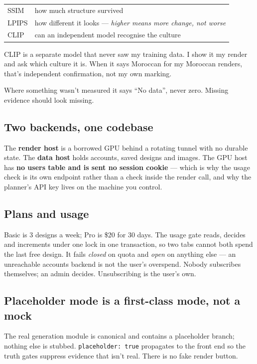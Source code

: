 \documentclass[10.5pt,a4paper]{article}
\begin{document}
\begin{tabularx}{\linewidth}{@{}lX@{}}
\toprule
SSIM & how much structure survived\\
LPIPS & how different it looks --- \emph{higher means more change, not worse}\\
CLIP & can an independent model recognise the culture\\
\bottomrule
\end{tabularx}

\begin{sayit}
CLIP is a separate model that never saw my training data. I show it my render and ask which culture
it is. When it says Moroccan for my Moroccan renders, that's independent confirmation, not my own
marking.
\end{sayit}
\begin{sayit}
Where something wasn't measured it says ``No data'', never zero. Missing evidence should look missing.
\end{sayit}

\subsection*{Two backends, one codebase}
The \textbf{render host} is a borrowed GPU behind a rotating tunnel with no durable state. The
\textbf{data host} holds accounts, saved designs and images. The GPU host has \textbf{no users table
and is sent no session cookie} --- which is why the usage check is its own endpoint rather than a
check inside the render call, and why the planner's API key lives on the machine you control.

\subsection*{Plans and usage}
Basic is 3 designs a week; Pro is \$20 for 30 days. The usage gate reads, decides and increments
under one lock in one transaction, so two tabs cannot both spend the last free design. It fails
\emph{closed} on quota and \emph{open} on anything else --- an unreachable accounts backend is not
the user's overspend. Nobody subscribes themselves; an admin decides. Unsubscribing is the user's own.

\subsection*{Placeholder mode is a first-class mode, not a mock}
The real generation module is canonical and contains a placeholder branch; nothing else is stubbed.
\texttt{placeholder: true} propagates to the front end so the truth gates suppress evidence that
isn't real. There is no fake render button.
\end{document}

